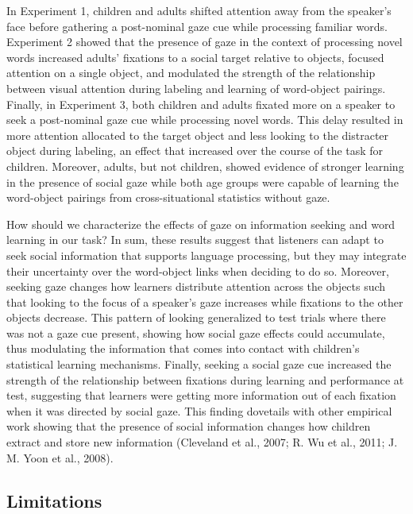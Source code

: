 \documentclass[oneside]{report}
\begin{document}
In Experiment 1, children and adults shifted attention away from the
speaker's face before gathering a post-nominal gaze cue while processing
familiar words. Experiment 2 showed that the presence of gaze in the
context of processing novel words increased adults' fixations to a
social target relative to objects, focused attention on a single object,
and modulated the strength of the relationship between visual attention
during labeling and learning of word-object pairings. Finally, in
Experiment 3, both children and adults fixated more on a speaker to seek
a post-nominal gaze cue while processing novel words. This delay
resulted in more attention allocated to the target object and less
looking to the distracter object during labeling, an effect that
increased over the course of the task for children. Moreover, adults,
but not children, showed evidence of stronger learning in the presence
of social gaze while both age groups were capable of learning the
word-object pairings from cross-situational statistics without gaze.

How should we characterize the effects of gaze on information seeking
and word learning in our task? In sum, these results suggest that
listeners can adapt to seek social information that supports language
processing, but they may integrate their uncertainty over the
word-object links when deciding to do so. Moreover, seeking gaze changes
how learners distribute attention across the objects such that looking
to the focus of a speaker's gaze increases while fixations to the other
objects decrease. This pattern of looking generalized to test trials
where there was not a gaze cue present, showing how social gaze effects
could accumulate, thus modulating the information that comes into
contact with children's statistical learning mechanisms. Finally,
seeking a social gaze cue increased the strength of the relationship
between fixations during learning and performance at test, suggesting
that learners were getting more information out of each fixation when it
was directed by social gaze. This finding dovetails with other empirical
work showing that the presence of social information changes how
children extract and store new information (Cleveland et al., 2007; R.
Wu et al., 2011; J. M. Yoon et al., 2008).

\subsection{Limitations}\label{limitations-2}
\end{document}
